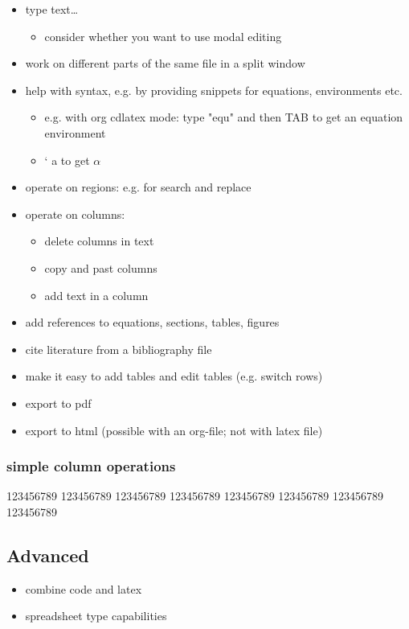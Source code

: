\documentclass[11pt]{article}
\begin{document}
\begin{itemize}
\item type text\ldots{}
\begin{itemize}
\item consider whether you want to use modal editing
\end{itemize}
\item work on different parts of the same file in a split window
\item help with syntax, e.g. by providing snippets for equations, environments etc.
\begin{itemize}
\item e.g. with org cdlatex mode: type "equ" and then TAB to get an equation environment
\item ` a to get \(\alpha\)
\end{itemize}
\item operate on regions: e.g. for search and replace
\item operate on columns:
\begin{itemize}
\item delete columns in text
\item copy and past columns
\item add text in a column
\end{itemize}
\item add references to equations, sections, tables, figures
\item cite literature from a bibliography file
\item make it easy to add tables and edit tables (e.g. switch rows)
\item export to pdf
\item export to html (possible with an org-file; not with latex file)
\end{itemize}


\subsubsection{simple column operations}

123456789
123456789
123456789
123456789
123456789
123456789
123456789
123456789


\subsection{Advanced}

\begin{itemize}
\item combine code and latex
\item spreadsheet type capabilities
\end{itemize}
\end{document}
